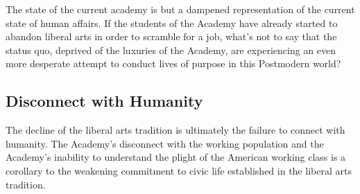 \documentclass[12pt,letterpaper]{article}
\begin{document}
%

%
%
%

The state of the current academy is but a dampened representation of the current state of human affairs.  If the students of the Academy have already started to abandon liberal arts in order to scramble for a job, what's not to say that the status quo, deprived of the luxuries of the Academy, are experiencing an even more desperate attempt to conduct lives of purpose in this Postmodern world?



\subsection{Disconnect with Humanity}
The decline of the liberal arts tradition is ultimately the failure to connect with humanity.  The Academy's disconnect with the working population and the Academy's inability to understand the plight of the American working class is a corollary to the weakening commitment to civic life established in the liberal arts tradition.  
\end{document}

